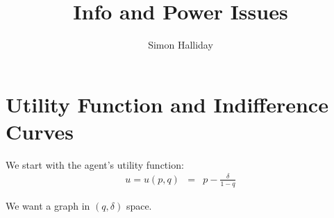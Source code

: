 \documentclass[a4paper,11pt]{article}
\title{Info and Power Issues}
\author{Simon Halliday}
\date{}
\begin{document}
\maketitle

\section{Utility Function and Indifference Curves}
We start with the agent's utility function: 
\begin{eqnarray}
u = u(p,q) &=&  p -\frac{\delta}{1 - q} \label{ufn}
\end{eqnarray}

We want a graph in $(q, \delta)$ space. 
\end{document}

